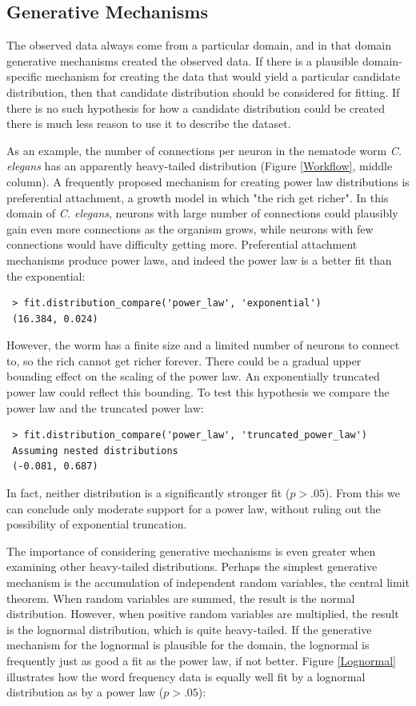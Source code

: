 \documentclass[10pt]{article}
\begin{document}
 \subsection*{Generative Mechanisms}
 The observed data always come from a particular domain, and in that domain generative mechanisms created the observed data. If there is a plausible domain-specific mechanism for creating the data that would yield a particular candidate distribution, then that candidate distribution should be considered for fitting. If there is no such hypothesis for how a candidate distribution could be created there is much less reason to use it to describe the dataset. 
 
 As an example, the number of connections per neuron in the nematode worm \textit{C. elegans} has an apparently heavy-tailed distribution (Figure \ref{Workflow}, middle column). A frequently proposed mechanism for creating power law distributions is preferential attachment, a growth model in which "the rich get richer". In this domain of \textit{C. elegans}, neurons with large number of connections could plausibly gain even more connections as the organism grows, while neurons with few connections would have difficulty getting more. Preferential attachment mechanisms produce power laws, and indeed the power law is a better fit than the exponential:
 
 \begin{verbatim}
 > fit.distribution_compare('power_law', 'exponential')
 (16.384, 0.024)
 \end{verbatim}
 
 However, the worm has a finite size and a limited number of neurons to connect to, so the rich cannot get richer forever. There could be a gradual upper bounding effect on the scaling of the power law. An exponentially truncated power law could reflect this bounding. To test this hypothesis we compare the power law and the truncated power law:
 
 \begin{verbatim}
 > fit.distribution_compare('power_law', 'truncated_power_law')
 Assuming nested distributions
 (-0.081, 0.687)
 \end{verbatim}
 
 In fact, neither distribution is a significantly stronger fit ($p>.05$). From this we can conclude only moderate support for a power law, without ruling out the possibility of exponential truncation.
 
 The importance of considering generative mechanisms is even greater when examining other heavy-tailed distributions. Perhaps the simplest generative mechanism is the accumulation of independent random variables, the central limit theorem. When random variables are summed, the result is the normal distribution. However, when positive random variables are multiplied, the result is the lognormal distribution, which is quite heavy-tailed. If the generative mechanism for the lognormal is plausible for the domain, the lognormal is frequently just as good a fit as the power law, if not better. Figure \ref{Lognormal} illustrates how the word frequency data is equally well fit by a lognormal distribution as by a power law ($p>.05$):
 
\end{document}
